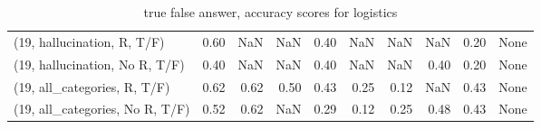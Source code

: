 \begin{table*}[h!]
\begin{adjustbox}{width=2\columnwidth,center}
\begin{tabular}{lrrr|rrr|rrr}
(19, hallucination, R, T/F)           &                      0.60 &                   NaN &                       NaN &                          0.40 &                       NaN &                           NaN &                                    NaN &                               0.20 &                                  None \\
(19, hallucination, No R, T/F)        &                      0.40 &                   NaN &                       NaN &                          0.40 &                       NaN &                           NaN &                                   0.40 &                               0.20 &                                  None \\
(19, all\_categories, R, T/F)          &                      0.62 &                  0.62 &                      0.50 &                          0.43 &                      0.25 &                          0.12 &                                    NaN &                               0.43 &                                  None \\
(19, all\_categories, No R, T/F)       &                      0.52 &                  0.62 &                       NaN &                          0.29 &                      0.12 &                          0.25 &                                   0.48 &                               0.43 &                                  None \\


\bottomrule
\end{tabular}
\end{adjustbox}
\caption{true false answer, accuracy scores for logistics}
\end{table*}